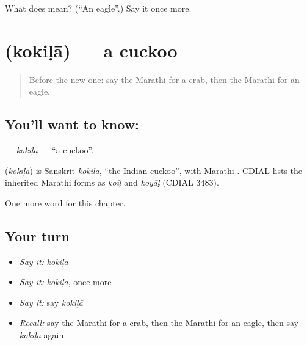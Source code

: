 \begin{tcolorbox}[breakable,colback=teal!4,colframe=teal!35!black,title={Before you move on}]
What does  mean? (\textquotedblleft{}An eagle\textquotedblright{}.) Say it once more.
\end{tcolorbox}
\section[\texorpdfstring{\mr{कोकिळा} (kokiḷā)}{कोकिळा (kokiḷā)}]{ (kokiḷā) — a cuckoo}

\label{lesson:MR-C188-kokila}



\begin{quote}
Before the new one: say the Marathi for a crab, then the Marathi for an eagle.
\end{quote}

\subsection*{You'll want to know: }
\textbf{} — \emph{kokiḷā} — \textquotedblleft{}a cuckoo\textquotedblright{}.

\begin{cousinweb}
\textbf{} (\emph{kokiḷā}) is Sanskrit \emph{kokilā}, \textquotedblleft{}the Indian cuckoo\textquotedblright{}, with Marathi \textbf{}. CDIAL lists the inherited Marathi forms as \emph{koīḷ} and \emph{koyāḷ} (CDIAL 3483).
\end{cousinweb}

\begin{grammarlens}[title={What you've built}]
One more word for this chapter.
\end{grammarlens}

\subsection*{Your turn}
\begin{itemize}
\raggedright
  \item \emph{Say it:} \emph{kokiḷā}
  \item \emph{Say it:} \emph{kokiḷā}, once more
  \item \emph{Say it:} say \emph{kokiḷā}
  \item \emph{Recall:} say the Marathi for a crab, then the Marathi for an eagle, then say \emph{kokiḷā} again
\end{itemize}

